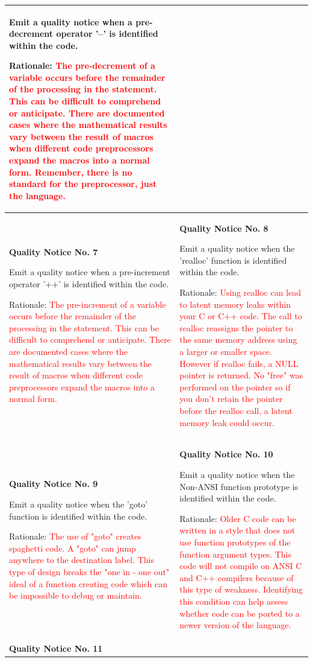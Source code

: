 {\begin{longtable}{||p{}|p{}||}
Emit a quality notice when a pre-decrement operator '--' is identified within the code.  

Rationale: \textcolor{red}{ The pre-decrement of a variable occurs before the remainder of the processing in the statement.  This can be difficult to comprehend or anticipate.  There are documented cases where the mathematical results vary between the result of macros when different code preprocessors expand the macros into a normal form.  Remember, there is no standard for the preprocessor, just the language.}
    \\
    \hline \textbf{Quality Notice No. 7}
    
Emit a quality notice when a pre-increment operator '++' is identified within the code.

Rationale:  \textcolor{red}{The pre-increment of a variable occurs before the remainder of the processing in the statement.  This can be difficult to comprehend or anticipate.  There are documented cases where the mathematical results vary between the result of macros when different code preprocessors expand the macros into a normal form.}  
& \textbf{Quality Notice No. 8}

Emit a quality notice when the 'realloc' function
is identified within the code.

Rationale:  \textcolor{red}{Using realloc can lead to latent memory leaks within your C or C++ code.  The call to realloc reassigns the pointer to the same memory address using a larger or smaller space.  However if realloc fails, a NULL pointer is returned.  No "free" was performed on the pointer so if you don't retain the pointer before the realloc call, a latent memory leak could occur.}
    \\
    \hline \textbf{Quality Notice No. 9}
    
Emit a quality notice when the 'goto' function
is identified within the code.

Rationale:  \textcolor{red}{The use of "goto" creates spaghetti code.  A "goto" can jump anywhere to the destination label.  This type of design breaks the "one in - one out" ideal of a function creating code which can be impossible to debug or maintain.}
 & \textbf{Quality Notice No. 10}
 
Emit a quality notice when the Non-ANSI function prototype is identified within the code.

Rationale:  \textcolor{red}{Older C code can be written in a style that does not use function prototypes of the function argument types.  This code will not compile on ANSI C and C++ compilers because of this type of weakness.  Identifying this condition can help assess whether code can be ported to a newer version of the language.}
    \\
    \hline \textbf{Quality Notice No. 11}
    

\end{longtable}}
